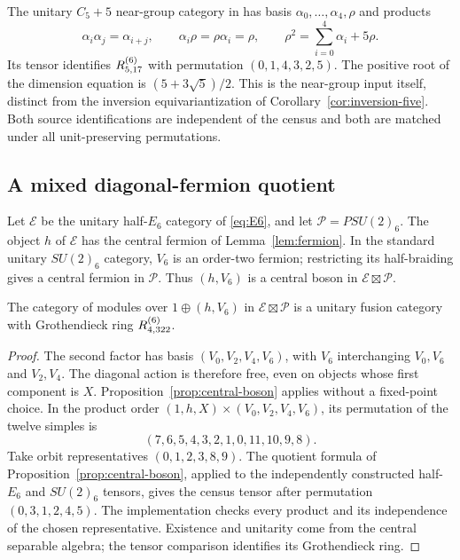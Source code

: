 The unitary $C_5+5$ near-group category in \cite[Example~13.8]{Izumi} has
basis $\alpha_0,\ldots,\alpha_4,\rho$ and products
\[
 \alpha_i\alpha_j=\alpha_{i+j},\qquad
 \alpha_i\rho=\rho\alpha_i=\rho,\qquad
 \rho^2=\sum_{i=0}^4\alpha_i+5\rho.
\]
Its tensor identifies $R^{(6)}_{5,17}$ with permutation $(0,1,4,3,2,5)$.
The positive root of the dimension equation is $(5+3\sqrt5)/2$.
This is the near-group input itself, distinct from the inversion
equivariantization of Corollary~\ref{cor:inversion-five}. Both source
identifications are independent of the census and both are matched under
all unit-preserving permutations.

\subsection{A mixed diagonal-fermion quotient}\label{sec:mixed-fermion}
Let $\mathcal E$ be the unitary half-$E_6$ category of \eqref{eq:E6}, and
let $\mathcal P=PSU(2)_6$. The object $h$ of $\mathcal E$ has the central
fermion of Lemma~\ref{lem:fermion}. In the standard unitary $SU(2)_6$
category, $V_6$ is an order-two fermion; restricting its half-braiding gives
a central fermion in $\mathcal P$. Thus $(h,V_6)$ is a central boson in
$\mathcal E\boxtimes\mathcal P$.

\begin{proposition}\label{prop:mixed-fermion}
The category of modules over $1\oplus(h,V_6)$ in
$\mathcal E\boxtimes\mathcal P$ is a unitary fusion category with
Grothendieck ring $R^{(6)}_{4,322}$.
\end{proposition}
\begin{proof}
The second factor has basis $(V_0,V_2,V_4,V_6)$, with $V_6$ interchanging
$V_0,V_6$ and $V_2,V_4$. The diagonal action is therefore free, even on
objects whose first component is $X$. Proposition~\ref{prop:central-boson}
applies without a fixed-point choice. In the product order
$(1,h,X)\times(V_0,V_2,V_4,V_6)$, its permutation of the twelve simples is
\[
 (7,6,5,4,3,2,1,0,11,10,9,8).
\]
Take orbit representatives $(0,1,2,3,8,9)$. The quotient formula
of Proposition~\ref{prop:central-boson}, applied to the independently
constructed half-$E_6$ and $SU(2)_6$ tensors, gives the census tensor after
permutation $(0,3,1,2,4,5)$. The implementation checks every product and
its independence of the chosen representative. Existence and unitarity
come from the central separable algebra; the tensor comparison identifies
its Grothendieck ring.
\end{proof}

